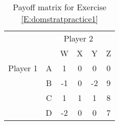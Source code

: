 \begin{xca}
\begin{table}[h]
\centering
\begin{tabular}{lccccc}
                      & \multicolumn{5}{c}{Player 2}                                                                                                  \\ \cline{2-6} 
\multicolumn{1}{l|}{} & \multicolumn{1}{c|}{} & \multicolumn{1}{c|}{W} & \multicolumn{1}{c|}{X} & \multicolumn{1}{c|}{Y} & \multicolumn{1}{c|}{Z} \\ \cline{2-6} 
\multicolumn{1}{l|}{Player 1} & \multicolumn{1}{c|}{A} & \multicolumn{1}{c|}{1} & \multicolumn{1}{c|}{0} & \multicolumn{1}{c|}{0} & \multicolumn{1}{c|}{0} \\ \cline{2-6} 
\multicolumn{1}{l|}{} & \multicolumn{1}{c|}{B} & \multicolumn{1}{c|}{-1} & \multicolumn{1}{c|}{0} & \multicolumn{1}{c|}{-2} & \multicolumn{1}{c|}{9} \\ \cline{2-6} 
\multicolumn{1}{l|}{} & \multicolumn{1}{c|}{C} & \multicolumn{1}{c|}{1} & \multicolumn{1}{c|}{1} & \multicolumn{1}{c|}{1} & \multicolumn{1}{c|}{8} \\ \cline{2-6} 
\multicolumn{1}{l|}{} & \multicolumn{1}{c|}{D} & \multicolumn{1}{c|}{-2} & \multicolumn{1}{c|}{0} & \multicolumn{1}{c|}{0} & \multicolumn{1}{c|}{7} \\ \cline{2-6} 
\end{tabular}
\caption{Payoff matrix for Exercise \ref{E:domstratpractice1}}
\label{T:domstratpractice1}

\end{table}
\end{xca}

